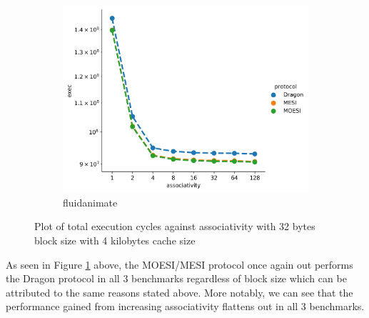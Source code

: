 \documentclass[nonacm,acmsmall,screen,11pt]{acmart}
\begin{document}
\begin{figure}[htb!]
  \begin{subfigure}{0.32\textwidth}
    \includegraphics[width=\columnwidth]{associativity-fluidanimate}
    \caption{fluidanimate}
  \end{subfigure}
  \caption{Plot of total execution cycles against associativity with 32 bytes block size with 4 kilobytes cache size}
  \label{fig:associativity}
\end{figure}
As seen in Figure \ref{fig:associativity} above, the MOESI/MESI protocol once again out performs the Dragon protocol in all 3 benchmarks regardless of block size which can be attributed to the same reasons stated above. More notably, we can see that the performance gained from increasing associativity flattens out in all 3 benchmarks. 

\clearpage


\end{document}
